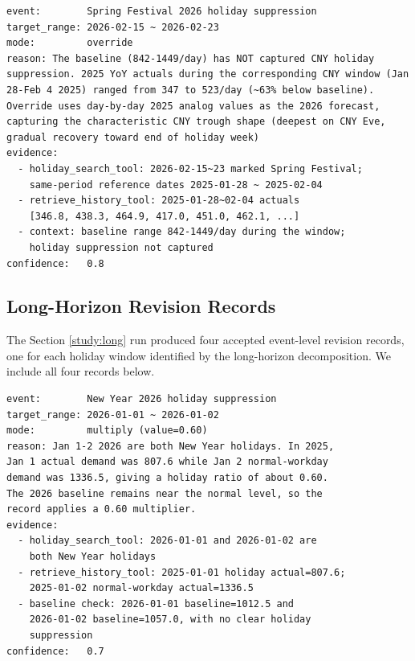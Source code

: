 \documentclass{article}
\theoremstyle{plain}
\theoremstyle{definition}
\theoremstyle{remark}
\begin{document}
\begin{lstlisting}[caption={Spring Festival revision: Holiday}, label={lst:case_study_6_2_2}]
event:        Spring Festival 2026 holiday suppression
target_range: 2026-02-15 ~ 2026-02-23
mode:         override
reason: The baseline (842-1449/day) has NOT captured CNY holiday suppression. 2025 YoY actuals during the corresponding CNY window (Jan 28-Feb 4 2025) ranged from 347 to 523/day (~63% below baseline). Override uses day-by-day 2025 analog values as the 2026 forecast, capturing the characteristic CNY trough shape (deepest on CNY Eve, gradual recovery toward end of holiday week)
evidence:
  - holiday_search_tool: 2026-02-15~23 marked Spring Festival;
    same-period reference dates 2025-01-28 ~ 2025-02-04
  - retrieve_history_tool: 2025-01-28~02-04 actuals
    [346.8, 438.3, 464.9, 417.0, 451.0, 462.1, ...]
  - context: baseline range 842-1449/day during the window;
    holiday suppression not captured
confidence:   0.8
\end{lstlisting}

\subsection{Long-Horizon Revision Records}\label{app:long_horizon_revision}

The Section \ref{study:long} run produced four accepted event-level revision records, one for each holiday window identified by the long-horizon decomposition. We include all four records below.

\begin{lstlisting}[caption={Long-horizon revision: New Year}, label={lst:case_study_6_3_new_year}]
event:        New Year 2026 holiday suppression
target_range: 2026-01-01 ~ 2026-01-02
mode:         multiply (value=0.60)
reason: Jan 1-2 2026 are both New Year holidays. In 2025,
Jan 1 actual demand was 807.6 while Jan 2 normal-workday
demand was 1336.5, giving a holiday ratio of about 0.60.
The 2026 baseline remains near the normal level, so the
record applies a 0.60 multiplier.
evidence:
  - holiday_search_tool: 2026-01-01 and 2026-01-02 are
    both New Year holidays
  - retrieve_history_tool: 2025-01-01 holiday actual=807.6;
    2025-01-02 normal-workday actual=1336.5
  - baseline check: 2026-01-01 baseline=1012.5 and
    2026-01-02 baseline=1057.0, with no clear holiday
    suppression
confidence:   0.7
\end{lstlisting}
\end{document}
